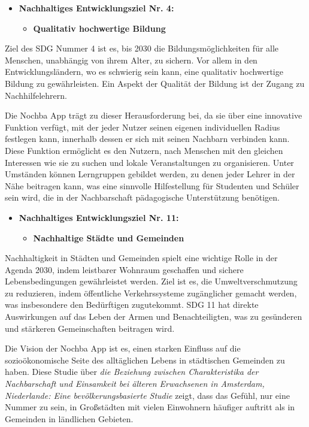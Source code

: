 \begin{itemize}
    \item \textbf{Nachhaltiges Entwicklungsziel Nr. 4:}
          \begin{itemize}
              \item \textbf{Qualitativ hochwertige Bildung}
          \end{itemize}
\end{itemize}

Ziel des SDG Nummer 4 ist es, bis 2030 die Bildungsmöglichkeiten für alle Menschen, unabhängig von ihrem Alter, zu sichern. Vor allem in den Entwicklungsländern, wo es schwierig sein kann, eine qualitativ hochwertige Bildung zu gewährleisten. Ein Aspekt der Qualität der Bildung ist der Zugang zu Nachhilfelehrern.

Die Nochba App trägt zu dieser Herausforderung bei, da sie über eine innovative Funktion verfügt, mit der jeder Nutzer seinen eigenen individuellen Radius festlegen kann, innerhalb dessen er sich mit seinen Nachbarn verbinden kann. Diese Funktion ermöglicht es den Nutzern, nach Menschen mit den gleichen Interessen wie sie zu suchen und lokale Veranstaltungen zu organisieren. Unter Umständen können Lerngruppen gebildet werden, zu denen jeder Lehrer in der Nähe beitragen kann, was eine sinnvolle Hilfestellung für Studenten und Schüler sein wird, die in der Nachbarschaft pädagogische Unterstützung benötigen.


\begin{itemize}
    \item \textbf{Nachhaltiges Entwicklungsziel Nr. 11:}
          \begin{itemize}
              \item \textbf{Nachhaltige Städte und Gemeinden}
          \end{itemize}
\end{itemize}

Nachhaltigkeit in Städten und Gemeinden spielt eine wichtige Rolle in der Agenda 2030, indem leistbarer Wohnraum geschaffen und sichere Lebensbedingungen gewährleistet werden. Ziel ist es, die Umweltverschmutzung zu reduzieren, indem öffentliche Verkehrssysteme zugänglicher gemacht werden, was insbesondere den Bedürftigen zugutekommt. SDG 11 hat direkte Auswirkungen auf das Leben der Armen und Benachteiligten, was zu gesünderen und stärkeren Gemeinschaften beitragen wird.

Die Vision der Nochba App ist es, einen starken Einfluss auf die sozioökonomische Seite des alltäglichen Lebens in städtischen Gemeinden zu haben. Diese Studie über \textit{die Beziehung zwischen Charakteristika der Nachbarschaft und Einsamkeit bei älteren Erwachsenen in Amsterdam, Niederlande: Eine bevölkerungsbasierte Studie} \cite{neighbourhood-characteristics-and-loneliness} zeigt, dass das Gefühl, nur eine Nummer zu sein, in Großstädten mit vielen Einwohnern häufiger auftritt als in Gemeinden in ländlichen Gebieten.

